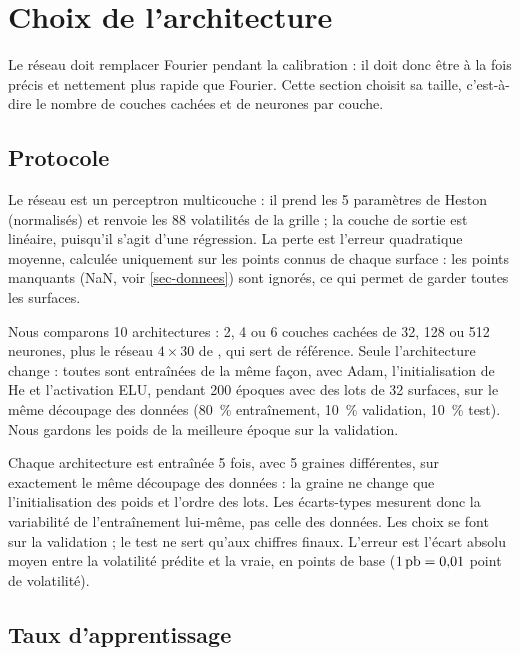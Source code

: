 
\section{Choix de l'architecture}
\label{sec-architectures}

Le réseau doit remplacer Fourier pendant la calibration : il doit donc être à la fois précis et nettement plus
rapide que Fourier. Cette section choisit sa taille, c'est-à-dire le nombre de couches cachées et de neurones par
couche.

\subsection{Protocole}
\label{sec-archi-protocole}

Le réseau est un perceptron multicouche : il prend les 5 paramètres de Heston (normalisés) et renvoie les 88
volatilités de la grille ; la couche de sortie est linéaire, puisqu'il s'agit d'une régression. La perte est
l'erreur quadratique moyenne, calculée uniquement sur les points connus de chaque surface : les points manquants
(NaN, voir \cref{sec-donnees}) sont ignorés, ce qui permet de garder toutes les surfaces.

Nous comparons 10 architectures : 2, 4 ou 6 couches cachées de 32, 128 ou 512 neurones, plus le réseau
$4\times30$ de \citet{horvath2021}, qui sert de référence. Seule l'architecture change : toutes sont entraînées
de la même façon, avec Adam, l'initialisation de He et l'activation ELU, pendant 200 époques avec des lots de 32
surfaces, sur le même découpage des données (\SI{80}{\percent} entraînement, \SI{10}{\percent} validation,
\SI{10}{\percent} test). Nous gardons les poids de la meilleure époque sur la validation.

Chaque architecture est entraînée 5 fois, avec 5 graines différentes, sur exactement le même découpage des
données : la graine ne change que l'initialisation des poids et l'ordre des lots. Les écarts-types mesurent donc
la variabilité de l'entraînement lui-même, pas celle des données. Les choix se font sur la validation ; le test ne
sert qu'aux chiffres finaux. L'erreur est l'écart absolu moyen entre la volatilité prédite et la vraie, en points
de base ($1\,\text{pb} = 0{,}01$ point de volatilité).

\subsection{Taux d'apprentissage}
\label{sec-archi-taux}

